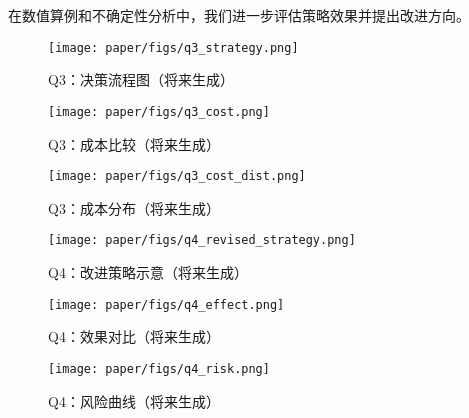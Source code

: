 在数值算例和不确定性分析中，我们进一步评估策略效果并提出改进方向。
\begin{figure}[htbp]\centering
  \texttt{[image: paper/figs/q3\_strategy.png]}
  \caption{Q3：决策流程图（将来生成）}
\end{figure}
\begin{figure}[htbp]\centering
  \texttt{[image: paper/figs/q3\_cost.png]}
  \caption{Q3：成本比较（将来生成）}
\end{figure}
\begin{figure}[htbp]\centering
  \texttt{[image: paper/figs/q3\_cost\_dist.png]}
  \caption{Q3：成本分布（将来生成）}
\end{figure}
\begin{figure}[htbp]\centering
  \texttt{[image: paper/figs/q4\_revised\_strategy.png]}
  \caption{Q4：改进策略示意（将来生成）}
\end{figure}
\begin{figure}[htbp]\centering
  \texttt{[image: paper/figs/q4\_effect.png]}
  \caption{Q4：效果对比（将来生成）}
\end{figure}
\begin{figure}[htbp]\centering
  \texttt{[image: paper/figs/q4\_risk.png]}
  \caption{Q4：风险曲线（将来生成）}
\end{figure}
